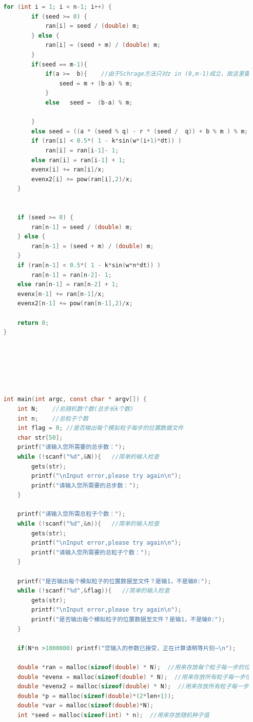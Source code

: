 \documentclass[a4paper,11pt]{article}
\begin{document}
\begin{appendices}
\begin{lstlisting}[language = C]
    for (int i = 1; i < n-1; i++) {
        if (seed >= 0) {
            ran[i] = seed / (double) m;
        } else {
            ran[i] = (seed + m) / (double) m;
        }
        if(seed == m-1){
            if(a >=  b){    //由于Schrage方法只对z in (0,m-1)成立，故这里要讨论z == m-1的情况
                seed = m + (b-a) % m;
            }
            else   seed =  (b-a) % m;

        }
        else seed = ((a * (seed % q) - r * (seed /  q)) + b % m ) % m;  //递推式
        if (ran[i] < 0.5*( 1 - k*sin(w*(i+1)*dt)) )
            ran[i] = ran[i-1]- 1;
        else ran[i] = ran[i-1] + 1;
        evenx[i] += ran[i]/x;
        evenx2[i] += pow(ran[i],2)/x;
    }
    
    
    if (seed >= 0) {
        ran[n-1] = seed / (double) m;
    } else {
        ran[n-1] = (seed + m) / (double) m;
    }
    if (ran[n-1] < 0.5*( 1 - k*sin(w*n*dt)) )
        ran[n-1] = ran[n-2]- 1;
    else ran[n-1] = ran[n-2] + 1;
    evenx[n-1] += ran[n-1]/x;
    evenx2[n-1] += pow(ran[n-1],2)/x;
    
    return 0;
}






int main(int argc, const char * argv[]) {
    int N;    //总随机数个数(总步长k个数)
    int n;    //总粒子个数
    int flag = 0; //是否输出每个模拟粒子每步的位置数据文件
    char str[50];
    printf("请输入您所需要的总步数：");
    while (!scanf("%d",&N)){   //简单的输入检查
        gets(str);
        printf("\nInput error,please try again\n");
        printf("请输入您所需要的总步数：");
    }
    
    printf("请输入您所需总粒子个数：");
    while (!scanf("%d",&n)){   //简单的输入检查
        gets(str);
        printf("\nInput error,please try again\n");
        printf("请输入您所需要的总粒子个数：");
    }
    
    printf("是否输出每个模拟粒子的位置数据至文件？是输1，不是输0:");
    while (!scanf("%d",&flag)){   //简单的输入检查
        gets(str);
        printf("\nInput error,please try again\n");
        printf("是否输出每个模拟粒子的位置数据至文件？是输1，不是输0:");
    }

    if(N*n >1000000) printf("您输入的参数已接受，正在计算请稍等片刻~\n");

    double *ran = malloc(sizeof(double) * N);  //用来存放每个粒子每一步的位置
    double *evenx = malloc(sizeof(double) * N);  //用来存放所有粒子每一步位置的平均值
    double *evenx2 = malloc(sizeof(double) * N);  //用来存放所有粒子每一步位置平方的平均值
    double *p = malloc(sizeof(double)*(2*len+1));
    double *var = malloc(sizeof(double)*N);
    int *seed = malloc(sizeof(int) * n);  //用来存放随机种子值
    

\end{lstlisting}
\end{appendices}
\end{document}
